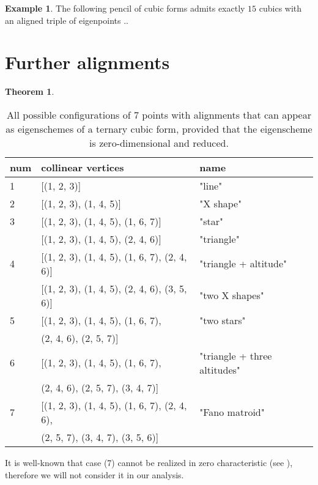 \documentclass[11pt, a4paper, reqno, captions=tableheading,bibliography=totoc]{scrartcl}
\theoremstyle{plain}
\newtheorem{theorem}[lemma]{Theorem}
\theoremstyle{definition}
\newtheorem{es}[lemma]{Example}
\begin{document}
\begin{es}
The following pencil of cubic forms admits exactly $15$ cubics with an aligned triple of eigenpoints ..
\end{es}

\section{Further alignments}
\label{further_alignments}

\begin{theorem}
\label{theorem:possible_alignments}

\end{theorem}

\begin{table}
\label{table:all_alignments}
\caption{All possible configurations of $7$ points with alignments that can appear as eigenschemes of a ternary cubic form, provided that the eigenscheme is zero-dimensional and reduced.}
\centering
\begin{tabular}{|lll|}\hline
  num & collinear vertices & name\\ \hline
 1& [(1, 2, 3)] & "line" \\
 2& [(1, 2, 3), (1, 4, 5)] & "X shape"\\
 3& [(1, 2, 3), (1, 4, 5), (1, 6, 7)] & "star" \\
  & [(1, 2, 3), (1, 4, 5), (2, 4, 6)] & "triangle" \\
 4& [(1, 2, 3), (1, 4, 5), (1, 6, 7), (2, 4, 6)] & "triangle + altitude" \\
  & [(1, 2, 3), (1, 4, 5), (2, 4, 6), (3, 5, 6)] & "two X shapes" \\
 5& [(1, 2, 3), (1, 4, 5), (1, 6, 7),  & "two stars"\\
  & \phantom{[}(2, 4, 6), (2, 5, 7)] & \\
 6& [(1, 2, 3), (1, 4, 5), (1, 6, 7), & "triangle + three altitudes"\\
  & \phantom{[} (2, 4, 6), (2, 5, 7), (3, 4, 7)] & \\
 7& [(1, 2, 3),
   (1, 4, 5),
   (1, 6, 7),
   (2, 4, 6), & "Fano matroid" \\
  & \phantom{[} (2, 5, 7),
   (3, 4, 7),
   (3, 5, 6)] & \\ \hline
\end{tabular}
\end{table}

It is well-known that case (7) cannot be realized in zero characteristic (see \cite{Whitney1935}), therefore we will not consider it in our analysis.
\end{document}

